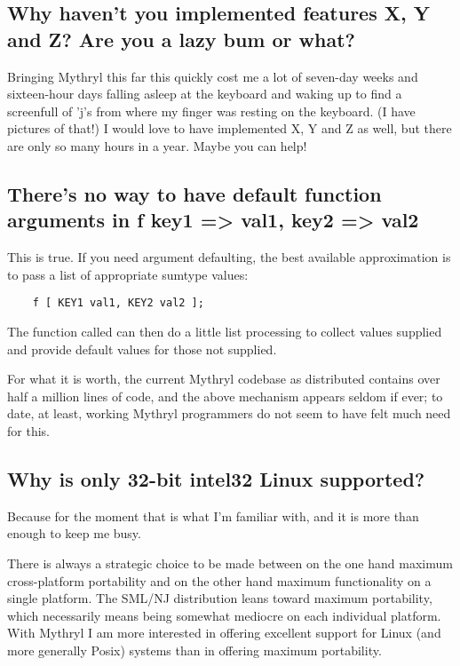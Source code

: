 \subsection{Why haven't you implemented features X, Y and Z?  Are you a lazy bum or what?}

Bringing Mythryl this far this quickly cost me a lot of seven-day weeks 
and sixteen-hour days falling asleep at the keyboard and waking up to 
find a screenfull of 'j's from where my finger was resting on the 
keyboard.  (I have pictures of that!)  I would love to have 
implemented X, Y and Z as well, but there are only so many hours in a 
year.  Maybe you can help!

\subsection{There's no way to have default function arguments in f { key1 => val1, key2 => val2 }}

This is true.  If you need argument defaulting, the best available 
approximation is to pass a list of appropriate sumtype values: 
\begin{verbatim}
    f [ KEY1 val1, KEY2 val2 ];
\end{verbatim}
The function called can then do a little list processing to collect 
values supplied and provide default values for those not supplied.

For what it is worth, the current Mythryl codebase as distributed 
contains over half a million lines of code, and the above mechanism 
appears seldom if ever;  to date, at least, working Mythryl programmers 
do not seem to have felt much need for this.

\subsection{Why is only 32-bit intel32 Linux supported?}

Because for the moment that is what I'm familiar with, and it is more 
than enough to keep me busy.

There is always a strategic choice to be made between on the one hand 
maximum cross-platform portability and on the other hand maximum 
functionality on a single platform.  The SML/NJ distribution leans 
toward maximum portability, which necessarily means being somewhat 
mediocre on each individual platform.  With Mythryl I am more 
interested in offering excellent support for Linux (and more generally 
Posix) systems than in offering maximum portability.

